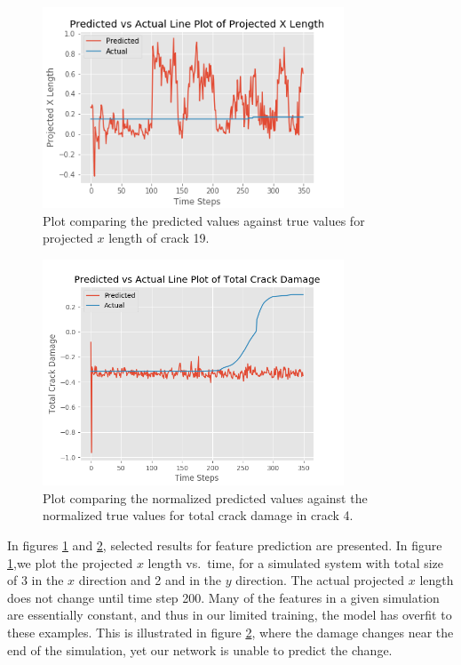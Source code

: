 \begin{figure}[!htb]
\centering
\includegraphics[width=0.8\textwidth]{images/Projected_X_Length_compare_transformed}
\caption{Plot comparing the predicted values against true values for projected $x$ length of crack 19.}
\label{fig:proj_y}
\end{figure}

\begin{figure}[!htb]
\centering
\includegraphics[width=0.8\textwidth]{images/Total_Crack_Damage_compare}
\caption{Plot comparing the normalized predicted values against the normalized true values for total crack damage in crack 4.}
\label{fig:tot_dam}
\end{figure}

In figures \ref{fig:proj_y} and \ref{fig:tot_dam}, selected results for feature prediction are presented. In figure \ref{fig:proj_y},we plot the projected $x$ length vs.\ time, for a simulated system with total size of 3 in the $x$ direction and 2 and in the $y$ direction.
The actual projected $x$ length does not change until time step 200.  Many of the features in a given simulation are essentially constant, and thus in our limited training, the model has overfit to these examples. This is illustrated in figure \ref{fig:tot_dam}, where the damage changes near the end of the simulation, yet our network is unable to predict the change.

